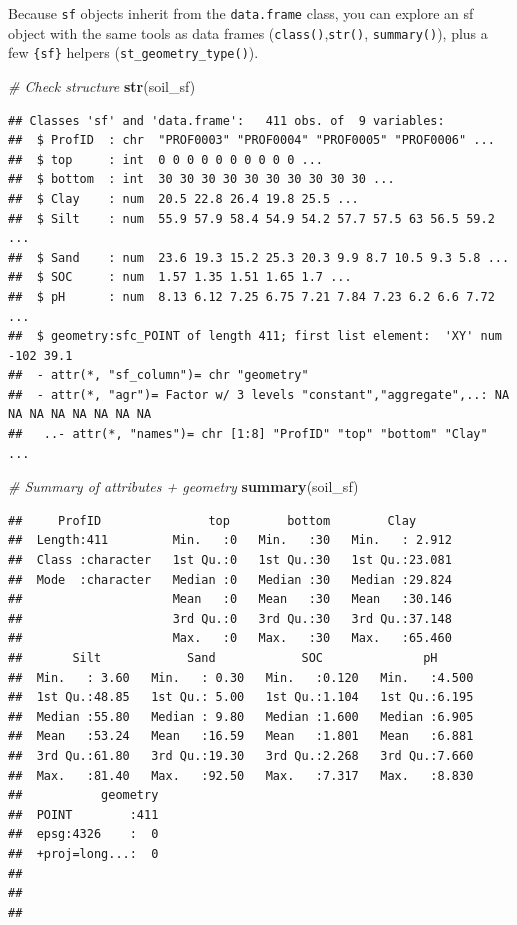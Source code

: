 \documentclass[
  10pt,
  b5paper,
  oneside]{book}
\newenvironment{Shaded}{\begin{snugshade}}{\end{snugshade}}
\newcommand{\CommentTok}[1]{\textcolor[rgb]{0.56,0.35,0.01}{\textit{#1}}}
\newcommand{\FunctionTok}[1]{\textcolor[rgb]{0.13,0.29,0.53}{\textbf{#1}}}
\newcommand{\NormalTok}[1]{#1}
\begin{document}
Because \texttt{sf} objects inherit from the \texttt{data.frame} class, you can explore an sf object with the same tools as data frames (\texttt{class()},\texttt{str()}, \texttt{summary()}), plus a few \texttt{\{sf\}} helpers (\texttt{st\_geometry\_type()}).

\begin{Shaded}
\begin{Highlighting}[]
\CommentTok{\# Check structure}
\FunctionTok{str}\NormalTok{(soil\_sf)}
\end{Highlighting}
\end{Shaded}

\begin{verbatim}
## Classes 'sf' and 'data.frame':   411 obs. of  9 variables:
##  $ ProfID  : chr  "PROF0003" "PROF0004" "PROF0005" "PROF0006" ...
##  $ top     : int  0 0 0 0 0 0 0 0 0 0 ...
##  $ bottom  : int  30 30 30 30 30 30 30 30 30 30 ...
##  $ Clay    : num  20.5 22.8 26.4 19.8 25.5 ...
##  $ Silt    : num  55.9 57.9 58.4 54.9 54.2 57.7 57.5 63 56.5 59.2 ...
##  $ Sand    : num  23.6 19.3 15.2 25.3 20.3 9.9 8.7 10.5 9.3 5.8 ...
##  $ SOC     : num  1.57 1.35 1.51 1.65 1.7 ...
##  $ pH      : num  8.13 6.12 7.25 6.75 7.21 7.84 7.23 6.2 6.6 7.72 ...
##  $ geometry:sfc_POINT of length 411; first list element:  'XY' num  -102 39.1
##  - attr(*, "sf_column")= chr "geometry"
##  - attr(*, "agr")= Factor w/ 3 levels "constant","aggregate",..: NA NA NA NA NA NA NA NA
##   ..- attr(*, "names")= chr [1:8] "ProfID" "top" "bottom" "Clay" ...
\end{verbatim}

\begin{Shaded}
\begin{Highlighting}[]
\CommentTok{\# Summary of attributes + geometry}
\FunctionTok{summary}\NormalTok{(soil\_sf)}
\end{Highlighting}
\end{Shaded}

\begin{verbatim}
##     ProfID               top        bottom        Clay       
##  Length:411         Min.   :0   Min.   :30   Min.   : 2.912  
##  Class :character   1st Qu.:0   1st Qu.:30   1st Qu.:23.081  
##  Mode  :character   Median :0   Median :30   Median :29.824  
##                     Mean   :0   Mean   :30   Mean   :30.146  
##                     3rd Qu.:0   3rd Qu.:30   3rd Qu.:37.148  
##                     Max.   :0   Max.   :30   Max.   :65.460  
##       Silt            Sand            SOC              pH       
##  Min.   : 3.60   Min.   : 0.30   Min.   :0.120   Min.   :4.500  
##  1st Qu.:48.85   1st Qu.: 5.00   1st Qu.:1.104   1st Qu.:6.195  
##  Median :55.80   Median : 9.80   Median :1.600   Median :6.905  
##  Mean   :53.24   Mean   :16.59   Mean   :1.801   Mean   :6.881  
##  3rd Qu.:61.80   3rd Qu.:19.30   3rd Qu.:2.268   3rd Qu.:7.660  
##  Max.   :81.40   Max.   :92.50   Max.   :7.317   Max.   :8.830  
##           geometry  
##  POINT        :411  
##  epsg:4326    :  0  
##  +proj=long...:  0  
##                     
##                     
## 
\end{verbatim}
\end{document}
